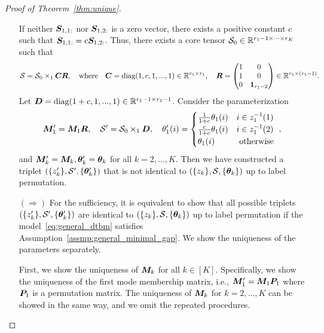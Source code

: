 \documentclass[lettersize,onecolumn,journal]{IEEEtran}
\theoremstyle{definition}
\theoremstyle{definition}
\newcommand{\of}[1]{\left(#1\right)}
\begin{document}
\begin{proof}[Proof of Theorem~\ref{thm:unique}]
\begin{enumerate}
If neither $\bm S_{1,1:}$ nor $\bm S_{1,2:}$ is a zero vector, there exists a positive constant $c$ such that $\bm S_{1,1:} = c \bm S_{1,2:}$. Thus, there exists a core tensor $\mathcal{S}_0 \in \mathbb{R}^{r_1 -1 \times \cdots \times r_K}$ such that 
\begin{equation}
    \mathcal{S} = \mathcal{S}_0 \times_1 \bm C \bm{R}, \quad \text{where} \quad \bm C = \text{diag}(1, c, 1,...,1) \in \mathbb{R}^{r_1 \times r_1}, \quad \bm{R} = \begin{pmatrix}
    1& 0\\
    1&0 \\
    0 & \mathbf{1}_{r_1-2}
    \end{pmatrix} \in \mathbb{R}^{r_1 \times (r_1 -1)}.
\end{equation}
Let $\bm{D} = \text{diag}(1+c, 1,...,1) \in \mathbb{R}^{r_1 -1 \times r_1 -1}$. Consider the parameterization
\begin{equation}
    \bm M'_1 = \bm M_1 \bm{R}, \quad \mathcal{S}' = \mathcal{S}_0 \times_1 \bm{D}, \quad \theta'_{1}(i) = \begin{cases}
    \frac{1}{1+c} \theta_{1}(i) & i \in z_{1}^{-1}(1)\\
     \frac{c}{1+c} \theta_{1}(i) & i \in z_{1}^{-1}(2)\\
     \theta_{1}(i) & \text{ otherwise }
    \end{cases},
\end{equation}
and $\bm M'_k = \bm M_k, \boldsymbol{\theta}'_k = \boldsymbol{\theta}_k$ for all $k = 2, \ldots, K$. Then we have constructed a
triplet $\of{ \{z'_k\}, \tS', \{ \mtheta'_k \} }$ that is not identical to $\of{ \{z_k\}, \tS, \{ \mtheta_k \} }$ up to label permutation. 

\item[$(\Rightarrow)$] For the sufficiency, it is equivalent to show that all possible triplets $\of{ \{z'_k\}, \tS', \{ \mtheta'_k \} }$ are identical to $\of{ \{z_k\}, \tS, \{ \mtheta_k \} }$ up to label permutation if the model~\eqref{eq:general_dtbm} satisfies Assumption~\eqref{assmp:general_minimal_gap}. We show the uniqueness of the parameters separately.


First, we show the uniqueness of $\bm M_k$ for all $k \in [K]$. Specifically, we show the uniqueness of the first mode membership matrix, i.e., $\bm M'_1 = \bm M_1\bm{P}_1$ where $\bm{P}_1$ is a permutation matrix. The uniqueness of $\bm M_k$ for $k = 2,\ldots, K$ can be showed in the same way, and we omit the repeated procedures.


\end{enumerate}
\end{proof}
\end{document}
